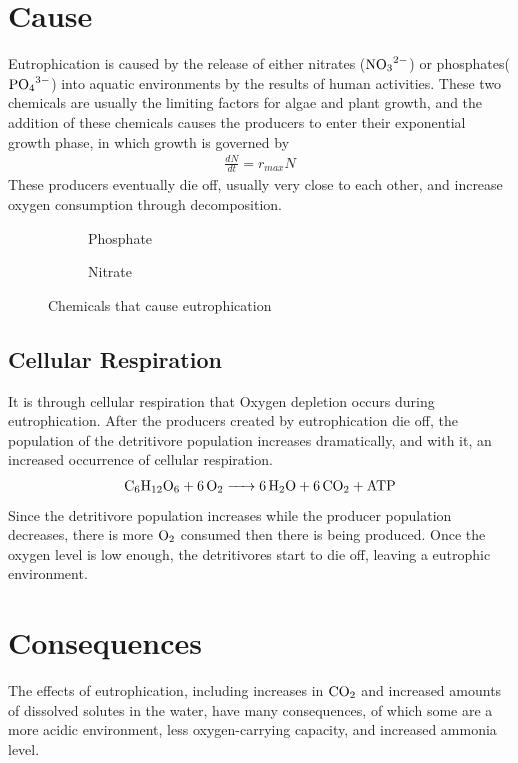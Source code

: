 \documentclass{article}
\begin{document}
\section{Cause}
Eutrophication is caused by the release of either nitrates ($\ce{NO3^2-}$) or phosphates($\ce{PO4^3-}$) into aquatic environments by the results of human activities.
These two chemicals are usually the limiting factors for algae and plant growth, and the addition of these chemicals causes the producers to enter their exponential growth phase, in which growth is governed by
\begin{align}
    \frac{dN}{dt} = r_{max}N
\end{align}
These producers eventually die off, usually very close to each other, and increase oxygen consumption through decomposition.
\begin{figure}[h]
    \begin{subfigure}{.5\textwidth}
        \centering
        \caption{Phosphate}
    \end{subfigure}%
    \begin{subfigure}{.5\textwidth}
        \centering
        \caption{Nitrate}
    \end{subfigure}
    \caption{Chemicals that cause eutrophication}
\end{figure}
    \subsection{Cellular Respiration}
    It is through cellular respiration that Oxygen depletion occurs during eutrophication. 
    After the producers created by eutrophication die off, the population of the detritivore population increases dramatically, and with it, an increased occurrence of cellular respiration.
    \begin{align}
        \ce{C6H12O6 + 6O2 -> 6H2O + 6CO2 + ATP}
    \end{align}
    Since the detritivore population increases while the producer population decreases, there is more $\ce{O2}$ consumed then there is being produced. Once the oxygen level is low enough, the detritivores start to die off, leaving a eutrophic environment.
\section{Consequences}
The effects of eutrophication, including increases in $\ce{CO2}$ and increased amounts of dissolved solutes in the water, have many consequences, of which some are a more acidic environment, less oxygen-carrying capacity, and increased ammonia level.
\end{document}
